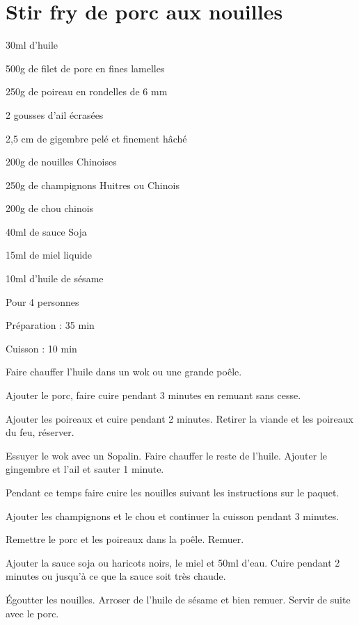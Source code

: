 \section[\normalsize{Stir fry de porc aux nouilles}]{Stir fry de porc aux nouilles}
\begin{ingredients}
\item 30ml d'huile
\item 500g de filet de porc en fines lamelles 
\item 250g de poireau en rondelles de 6 mm 
\item 2 gousses d'ail \'ecras\'ees 
\item 2,5 cm de gigembre pel\'e et finement h\^ach\'e 
\item 200g de nouilles Chinoises 
\item 250g de champignons Huitres ou Chinois 
\item 200g de chou chinois 
\item 40ml de sauce Soja
\item 15ml de miel liquide 
\item 10ml d'huile de s\'esame 
\end{ingredients}
\begin{infos}
\item Pour 4 personnes
\item Préparation : 35 min
\item Cuisson : 10 min
\end{infos}
\begin{etapes}
\item Faire chauffer l'huile dans un wok ou une grande poêle. 
\item Ajouter le porc, faire cuire pendant 3 minutes en remuant sans cesse. 
\item Ajouter les poireaux et cuire pendant 2 minutes. Retirer la viande et les poireaux du feu, r\'eserver.
\item Essuyer le wok avec un Sopalin. Faire chauffer le reste de l'huile. Ajouter le gingembre et l'ail et sauter 1 minute.
\item Pendant ce temps faire cuire les nouilles suivant les instructions sur le paquet.
\item Ajouter les champignons et le chou et continuer la cuisson pendant 3 minutes. 
\item Remettre le porc et les poireaux dans la poêle. Remuer. 
\item Ajouter la sauce soja ou haricots noirs, le miel et 50ml d'eau. Cuire pendant 2 minutes ou jusqu'\`a ce que la sauce soit tr\`es chaude.
\item Égoutter les nouilles. Arroser de l'huile de s\'esame et bien remuer. Servir de suite avec le porc.
\end{etapes}
\begin{conseils}
\end{conseils}
